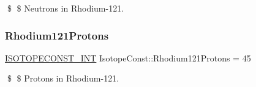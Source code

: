 \$ \$ Neutrons in Rhodium-\/121. \mbox{\label{group___isotope_const-_rhodium-_rh121_ga180b0e00ca801a25e5c37c1f0a2887c1}} 
\subsubsection{\texorpdfstring{Rhodium121\+Protons}{Rhodium121Protons}}
{\footnotesize\ttfamily \mbox{\hyperlink{group___isotope_const-_macros_ga5f18360b3e99483a35c32d789e62621c}{I\+S\+O\+T\+O\+P\+E\+C\+O\+N\+S\+T\+\_\+\+I\+NT}} Isotope\+Const\+::\+Rhodium121\+Protons = 45}

\$ \$ Protons in Rhodium-\/121. 